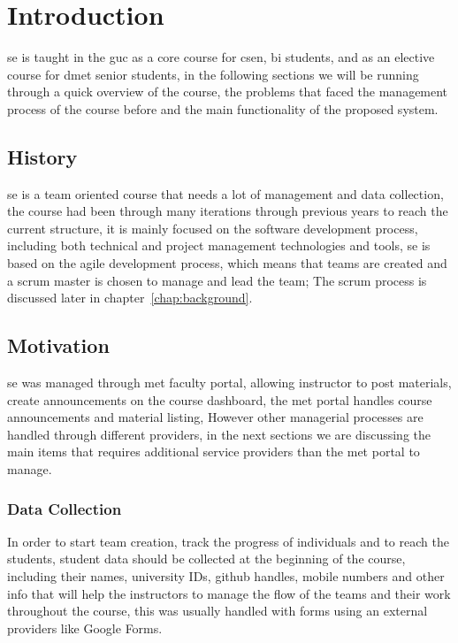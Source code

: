 \chapter{Introduction}
\label{chap:intro}

\ac{se} is taught in the \ac{guc} as a core course for \ac{csen}, \ac{bi} students, and as an elective course for \ac{dmet} senior students, in the following
sections we will be running through a quick overview of the course, the problems that faced the management process of the course before and the main
functionality of the proposed system.

\section{History}
\label{sec:history}
\ac{se} is a team oriented course that needs a lot of management and data collection, the course had been through many iterations through previous years
to reach the current structure, it is mainly focused on the software development process, including both technical and project management
technologies and tools, \ac{se} is based on the agile development process, which means that teams are created and a scrum master is chosen to manage
and lead the team; The scrum process is discussed later in chapter~\ref{chap:background}.

\section{Motivation}
\label{sec:motivation}

\ac{se} was managed through \ac{met} faculty portal, allowing instructor to post materials,
create announcements on the course dashboard, the \ac{met} portal handles course announcements and material listing, However other
managerial processes are handled through different providers, in the next sections we are discussing the main items that requires
additional service providers than the \ac{met} portal to manage.


\subsection{Data Collection}
\label{sub:data-collection}

In order to start team creation, track the progress of individuals and to reach the students, student data should be collected
at the beginning of the course, including their names, university IDs, github handles, mobile numbers and other info that will
help the instructors to manage the flow of the teams and their work throughout the course, this was usually handled with
forms using an external providers like Google Forms.

